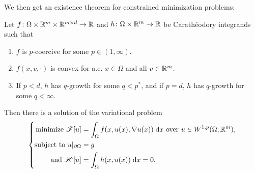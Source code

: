 We then get an existence theorem for constrained minimization problems:
\begin{theorem}
    Let $f \colon \Omega \times \mathbb{R}^m \times \mathbb{R}^{m \times d} \to \mathbb{R}$ and $h \colon \Omega \times \mathbb{R}^m \to \mathbb{R}$ be Carath\'eodory integrands such that 
    \begin{enumerate}[label={\rm (\roman*)}]
        \item $f$ is $p$-coercive for some $p \in (1,\infty)$.
        \item $f(x,v,\cdot)$ is convex for a.e. $x \in \Omega$ and all $v \in \mathbb{R}^m$.
        \item If $p < d$, $h$ has $q$-growth for some $q < p^*$, and if $p = d$, $h$ has $q$-growth for some $q < \infty$.
    \end{enumerate}
    Then there is a solution of the variational problem 
    \begin{equation}
        \left\{ 
        \begin{aligned}
            \text{minimize } \mathscr{F}[u] &= \int_\Omega f(x,u(x),\nabla u(x)) \; \mathrm{d} x \text{ over } u \in W^{1,p}(\Omega;\mathbb{R}^m), \\
            \text{subject to } u\vert_{\partial \Omega} &= g \\
            \text{and } \mathscr{H}[u] &= \int_\Omega h(x,u(x)) \; \mathrm{d} x = 0.
        \end{aligned}
        \right.
    \end{equation}
\end{theorem}